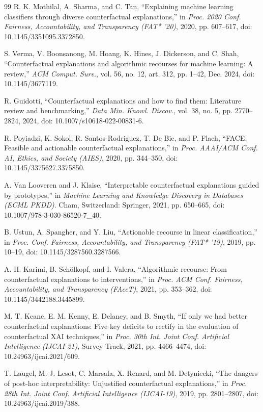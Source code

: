 \documentclass[11pt,a4paper]{article}
\begin{document}
\begin{thebibliography}{99}
 R. K. Mothilal, A. Sharma, and C. Tan, ``Explaining machine learning classifiers through diverse counterfactual explanations,'' in \emph{Proc. 2020 Conf. Fairness, Accountability, and Transparency (FAT* '20)}, 2020, pp. 607--617, doi: 10.1145/3351095.3372850.

 S. Verma, V. Boonsanong, M. Hoang, K. Hines, J. Dickerson, and C. Shah, ``Counterfactual explanations and algorithmic recourses for machine learning: A review,'' \emph{ACM Comput. Surv.}, vol. 56, no. 12, art. 312, pp. 1--42, Dec. 2024, doi: 10.1145/3677119.

 R. Guidotti, ``Counterfactual explanations and how to find them: Literature review and benchmarking,'' \emph{Data Min. Knowl. Discov.}, vol. 38, no. 5, pp. 2770--2824, 2024, doi: 10.1007/s10618-022-00831-6.

 R. Poyiadzi, K. Sokol, R. Santos-Rodriguez, T. De Bie, and P. Flach, ``FACE: Feasible and actionable counterfactual explanations,'' in \emph{Proc. AAAI/ACM Conf. AI, Ethics, and Society (AIES)}, 2020, pp. 344--350, doi: 10.1145/3375627.3375850.

 A. Van Looveren and J. Klaise, ``Interpretable counterfactual explanations guided by prototypes,'' in \emph{Machine Learning and Knowledge Discovery in Databases (ECML PKDD)}. Cham, Switzerland: Springer, 2021, pp. 650--665, doi: 10.1007/978-3-030-86520-7\_40.

 B. Ustun, A. Spangher, and Y. Liu, ``Actionable recourse in linear classification,'' in \emph{Proc. Conf. Fairness, Accountability, and Transparency (FAT* '19)}, 2019, pp. 10--19, doi: 10.1145/3287560.3287566.

 A.-H. Karimi, B. Sch\"{o}lkopf, and I. Valera, ``Algorithmic recourse: From counterfactual explanations to interventions,'' in \emph{Proc. ACM Conf. Fairness, Accountability, and Transparency (FAccT)}, 2021, pp. 353--362, doi: 10.1145/3442188.3445899.

 M. T. Keane, E. M. Kenny, E. Delaney, and B. Smyth, ``If only we had better counterfactual explanations: Five key deficits to rectify in the evaluation of counterfactual XAI techniques,'' in \emph{Proc. 30th Int. Joint Conf. Artificial Intelligence (IJCAI-21)}, Survey Track, 2021, pp. 4466--4474, doi: 10.24963/ijcai.2021/609.

 T. Laugel, M.-J. Lesot, C. Marsala, X. Renard, and M. Detyniecki, ``The dangers of post-hoc interpretability: Unjustified counterfactual explanations,'' in \emph{Proc. 28th Int. Joint Conf. Artificial Intelligence (IJCAI-19)}, 2019, pp. 2801--2807, doi: 10.24963/ijcai.2019/388.


\end{thebibliography}
\end{document}

